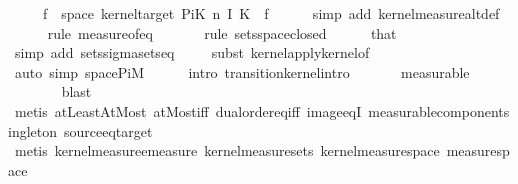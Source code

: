 \begin{isabellebody}
\ \ \ \ \ {\isachardoublequoteopen}{\isasymomega}\isactrlsub f\ {\isasymin}\ space\ {\isacharparenleft}{\kern0pt}kernel{\isacharunderscore}{\kern0pt}target\ {\isacharparenleft}{\kern0pt}PiK\ n\ I\ K{\isacharparenright}{\kern0pt}{\isacharparenright}{\kern0pt}{\isachardoublequoteclose}\ \ {\isasymomega}\isactrlsub f\isanewline
\ \ \ \ \isamarkupfalse%
\ {\isacharparenleft}{\kern0pt}simp\ add{\isacharcolon}{\kern0pt}\ kernel{\isacharunderscore}{\kern0pt}measure{\isacharunderscore}{\kern0pt}altdef{\isacharparenright}{\kern0pt}\isanewline
\ \ \ \ \isamarkupfalse%
\ {\isacharparenleft}{\kern0pt}rule\ measure{\isacharunderscore}{\kern0pt}of{\isacharunderscore}{\kern0pt}eq{\isacharparenright}{\kern0pt}\isanewline
\ \ \ \ \ \isamarkupfalse%
\ {\isacharparenleft}{\kern0pt}rule\ sets{\isachardot}{\kern0pt}space{\isacharunderscore}{\kern0pt}closed{\isacharparenright}{\kern0pt}\isanewline
\ \ \ \ \isamarkupfalse%
\ that\ \isamarkupfalse%
\ {\isacharparenleft}{\kern0pt}simp\ add{\isacharcolon}{\kern0pt}\ sets{\isachardot}{\kern0pt}sigma{\isacharunderscore}{\kern0pt}sets{\isacharunderscore}{\kern0pt}eq{\isacharparenright}{\kern0pt}\isanewline
\ \ \ \isamarkupfalse%
\ {\isacharparenleft}{\kern0pt}subst\ kernel{\isacharunderscore}{\kern0pt}apply{\isacharunderscore}{\kern0pt}kernel{\isacharunderscore}{\kern0pt}of{\isacharparenright}{\kern0pt}\isanewline
\ \ \ \ \ \ \ \isamarkupfalse%
\ {\isacharparenleft}{\kern0pt}auto\ simp{\isacharcolon}{\kern0pt}\ space{\isacharunderscore}{\kern0pt}PiM{\isacharparenright}{\kern0pt}\isanewline
\ \ \ \ \isamarkupfalse%
\ {\isacharparenleft}{\kern0pt}intro\ transition{\isacharunderscore}{\kern0pt}kernel{\isachardot}{\kern0pt}intro{\isacharparenright}{\kern0pt}\isanewline
\ \ \ \ \ \isamarkupfalse%
\ measurable\isanewline
\ \ \ \ \ \ \isamarkupfalse%
\ blast\isanewline
\ \ \ \ \ \ \ \isamarkupfalse%
\ {\isacharparenleft}{\kern0pt}metis\ atLeast{}AtMost\ atMost{\isacharunderscore}{\kern0pt}iff\ dual{\isacharunderscore}{\kern0pt}order{\isachardot}{\kern0pt}eq{\isacharunderscore}{\kern0pt}iff\ image{\isacharunderscore}{\kern0pt}eqI\ measurable{\isacharunderscore}{\kern0pt}component{\isacharunderscore}{\kern0pt}singleton\ source{\isacharunderscore}{\kern0pt}eq{\isacharunderscore}{\kern0pt}target{\isacharparenright}{\kern0pt}\isanewline
\ \ \ \ \isamarkupfalse%
\ {\isacharparenleft}{\kern0pt}metis\ kernel{\isacharunderscore}{\kern0pt}measure{\isacharunderscore}{\kern0pt}emeasure\ kernel{\isacharunderscore}{\kern0pt}measure{\isacharunderscore}{\kern0pt}sets\ kernel{\isacharunderscore}{\kern0pt}measure{\isacharunderscore}{\kern0pt}space\ measure{\isacharunderscore}{\kern0pt}space{\isacharparenright}{\kern0pt}\isanewline

\end{isabellebody}
